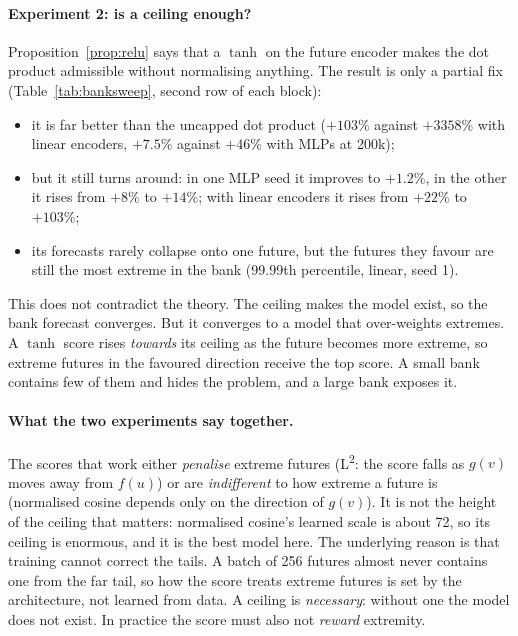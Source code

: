 \documentclass[11pt]{article}
\newcommand{\Ltwo}{L\textsuperscript{2}}
\theoremstyle{plain}
\theoremstyle{definition}
\theoremstyle{remark}
\begin{document}
\paragraph{Experiment 2: is a ceiling enough?} Proposition~\ref{prop:relu} says that a
$\tanh$ on the future encoder makes the dot product admissible without normalising
anything. The result is only a partial fix (Table~\ref{tab:banksweep}, second row of each
block):
\begin{itemize}
\item it is far better than the uncapped dot product ($+103\%$ against $+3358\%$ with linear
  encoders, $+7.5\%$ against $+46\%$ with MLPs at 200k);
\item but it still turns around: in one MLP seed it improves to $+1.2\%$, in the other it rises
  from $+8\%$ to $+14\%$; with linear encoders it rises from $+22\%$ to $+103\%$;
\item its forecasts rarely collapse onto one future, but the futures they favour are still
  the most extreme in the bank (99.99th percentile, linear, seed 1).
\end{itemize}
This does not contradict the theory. The ceiling makes the model exist, so the bank
forecast converges. But it converges to a model that over-weights extremes. A $\tanh$
score rises \emph{towards} its ceiling as the future becomes more extreme, so extreme futures
in the favoured direction receive the top score. A small bank contains few of them and
hides the problem, and a large bank exposes it.

\paragraph{What the two experiments say together.} The scores that work either
\emph{penalise} extreme futures (\Ltwo{}: the score falls as $g(v)$ moves away from $f(u)$) or
are \emph{indifferent} to how extreme a future is (normalised cosine depends only on the
direction of $g(v)$). It is not the height of the ceiling that matters: normalised cosine's
learned scale is about 72, so its ceiling is enormous, and it is the best model here. The
underlying reason is that training cannot correct the tails. A batch of 256 futures almost
never contains one from the far tail, so how the score treats extreme futures is set by the
architecture, not learned from data. A ceiling is \emph{necessary}: without one the model does
not exist. In practice the score must also not \emph{reward} extremity.

\end{document}
